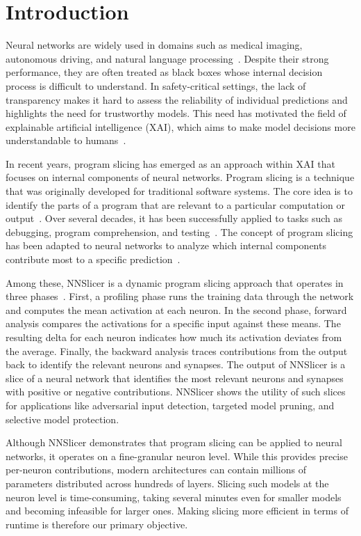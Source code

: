 \documentclass[
12pt,
fancyheadings,
a4paper,
twoside,
BCOR=0.7cm,
nobcorignoretitle,
grayscalebody,
]{stsreprt}
\begin{document}
\chapter{Introduction}

Neural networks are widely used in domains such as medical imaging, autonomous driving, and natural
language processing~\cite{lecun2015deep}.
Despite their strong performance, they are often treated as black boxes whose internal decision
process is difficult to understand.
In safety-critical settings, the lack of transparency makes it hard to assess the reliability of
individual predictions and highlights the need for trustworthy models.
This need has motivated the field of explainable artificial intelligence (XAI), which aims to make
model decisions more understandable to humans~\cite{Samek_2021}.

In recent years, program slicing has emerged as an approach within XAI that focuses on internal
components of neural networks.
Program slicing is a technique that was originally developed for traditional software systems.
The core idea is to identify the parts of a program that are relevant to a particular computation
or output~\cite{weiser1984program}.
Over several decades, it has been successfully applied to tasks such as debugging, program
comprehension, and testing~\cite{10.1145/1050849.1050865}.
The concept of program slicing has been adapted to neural networks to analyze which internal
components contribute most to a specific
prediction~\cite{wang2018interpret,zhang2020dynamic,zhou2024neusemslice}.

Among these, NNSlicer is a dynamic program slicing approach that operates in three
phases~\cite{zhang2020dynamic}.
First, a profiling phase runs the training data through the network and computes the mean
activation at each neuron.
In the second phase, forward analysis compares the activations for a specific input against these
means. The resulting delta for each neuron indicates how much its activation deviates from the
average.
Finally, the backward analysis traces contributions from the output back to identify the relevant
neurons and synapses.
The output of NNSlicer is a slice of a neural network that identifies the most relevant neurons and
synapses with positive or negative contributions.
NNSlicer shows the utility of such slices for applications like adversarial input detection,
targeted model pruning, and selective model protection.

Although NNSlicer demonstrates that program slicing can be applied to neural networks, it operates
on a fine-granular neuron level.
While this provides precise per-neuron contributions, modern architectures can contain millions of
parameters distributed across hundreds of layers.
Slicing such models at the neuron level is time-consuming, taking several minutes even for smaller
models and becoming infeasible for larger ones.
Making slicing more efficient in terms of runtime is therefore our primary objective.
\end{document}
